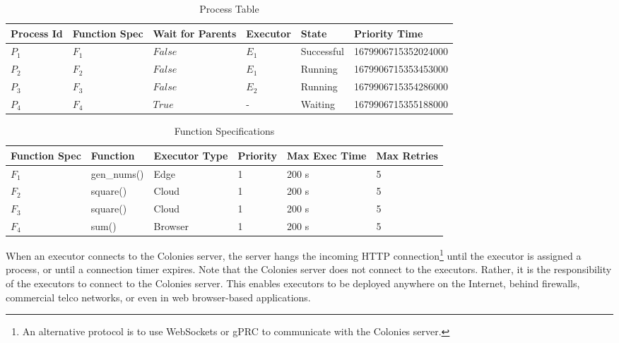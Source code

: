 \documentclass{article}
\begin{document}
\begin{table}[t]
	\caption{Process Table}
	\centering
	\begin{tabular}{llllll}
		\toprule
		\cmidrule(r){1-2}
        Process Id & Function Spec & Wait for Parents & Executor  & State      & Priority Time \\
		\midrule
        $P_{1}$    & $F_{1}$       & $False$          & $E_{1}$   & Successful & 1679906715352024000 \\
        $P_{2}$    & $F_{2}$       & $False$          & $E_{1}$   & Running    & 1679906715353453000 \\
        $P_{3}$    & $F_{3}$       & $False$          & $E_{2}$   & Running    & 1679906715354286000 \\
        $P_{4}$    & $F_{4}$       & $True$           & -         & Waiting    & 1679906715355188000 \\
		\bottomrule
	\end{tabular}
	\label{proctable}
\end{table}

\begin{table}[t]
	\caption{Function Specifications}
	\centering
	\begin{tabular}{llllll}
		\toprule
		\cmidrule(r){1-2}
        Function Spec & Function        & Executor Type & Priority & Max Exec Time & Max Retries \\
		\midrule
        $F_{1}$       & gen\_nums()     & Edge          & 1        & 200 s         & 5 \\
        $F_{2}$       & square()        & Cloud         & 1        & 200 s         & 5 \\
        $F_{3}$       & square()        & Cloud         & 1        & 200 s         & 5 \\
        $F_{4}$       & sum()           & Browser       & 1        & 200 s         & 5 \\
		\bottomrule
	\end{tabular}
	\label{functable}
\end{table}

When an executor connects to the Colonies server, the server hangs the incoming HTTP connection\footnote{An alternative protocol is to use WebSockets or gPRC to communicate with the Colonies server.} until the executor is assigned a process, or until a connection timer expires. Note that the Colonies server does not connect to the executors. Rather, it is the responsibility of the executors to connect to the Colonies server. This enables executors to be deployed anywhere on the Internet, behind firewalls, commercial telco networks, or even in web browser-based applications.
\end{document}
